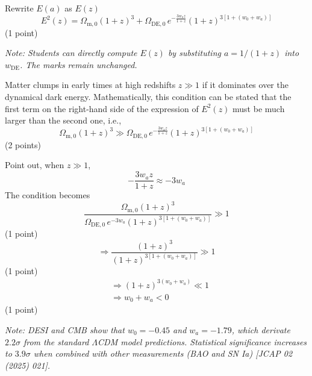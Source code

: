 \begin{description}
  Rewrite $E(a)$ as $E(z)$
  \[ E^2(z) = \Omega_{\mathrm{m},0}(1+z)^3 + \Omega_{\mathrm{DE},0}\,
     e^{-\frac{3w_a z}{1+z}}(1+z)^{3[1+(w_0+w_a)]} \]
  \hfill(1 point)

  \textit{Note: Students can directly compute $E(z)$ by substituting
  $a = 1/(1+z)$ into $w_{\mathrm{DE}}$. The marks remain unchanged.}

\item[(d)] Matter clumps in early times at high redshifts $z \gg 1$ if it
  dominates over the dynamical dark energy. Mathematically, this condition
  can be stated that the first term on the right-hand side of the expression
  of $E^2(z)$ must be much larger than the second one, i.e.,
  \[ \Omega_{\mathrm{m},0}(1+z)^3 \gg \Omega_{\mathrm{DE},0}\,
     e^{-\frac{3w_a z}{1+z}}(1+z)^{3[1+(w_0+w_a)]} \]
  \hfill(2 points)

  Point out, when $z \gg 1$,
  \[ -\frac{3w_a z}{1+z} \approx -3w_a \]
  The condition becomes
  \[ \frac{\Omega_{\mathrm{m},0}(1+z)^3}
     {\Omega_{\mathrm{DE},0}\,e^{-3w_a}(1+z)^{3[1+(w_0+w_a)]}} \gg 1 \]
  \hfill(1 point)
  \[ \Rightarrow \frac{(1+z)^3}{(1+z)^{3[1+(w_0+w_a)]}} \gg 1 \]
  \hfill(1 point)
  \begin{align*}
    &\Rightarrow (1+z)^{3(w_0+w_a)} \ll 1 \\
    &\Rightarrow w_0 + w_a < 0
  \end{align*}
  \hfill(1 point)

  \textit{Note: DESI and CMB show that $w_0 = -0.45$ and $w_a = -1.79$, which
  derivate $2.2\sigma$ from the standard $\Lambda$CDM model predictions.
  Statistical significance increases to $3.9\sigma$ when combined with other
  measurements (BAO and SN Ia) [JCAP 02 (2025) 021].}
\end{description}

